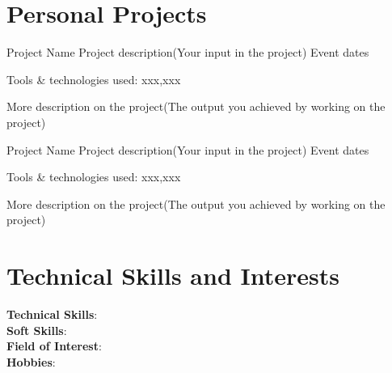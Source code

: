 \documentclass[a4paper,11pt]{article}
\begin{document}
  \resumeSubHeadingListEnd
\vspace{-8.5mm}



\section{\textbf{Personal Projects}}
\resumeSubHeadingListStart

    \resumeProject
      {Project Name} %
      {Project description(Your input in the project)} %
      {Event dates} %

      \resumeItemListStart
        \item {Tools \& technologies used: xxx,xxx}
        \item {More description on the project(The output you achieved by working on the project)}
    \resumeItemListEnd
    \vspace{-2.0mm}
    
    \resumeProject
      {Project Name} %
      {Project description(Your input in the project)} %
      {Event dates} %

      \resumeItemListStart
        \item {Tools \& technologies used: xxx,xxx}
        \item {More description on the project(The output you achieved by working on the project)}
    \resumeItemListEnd
    \vspace{-2.0mm}
    
      
  \resumeSubHeadingListEnd
\vspace{-5.5mm}



\section{\textbf{Technical Skills and Interests}}
 \begin{itemize}[leftmargin=0.1in, label={}]
    \small{\item{
     \textbf{Technical Skills}{: } \\
     \textbf{Soft Skills}{: } \\
     \textbf{Field of Interest}{: } \\
     \textbf{Hobbies}{: } \\
    }}
 \end{itemize}
 \vspace{-16pt}
\end{document}
